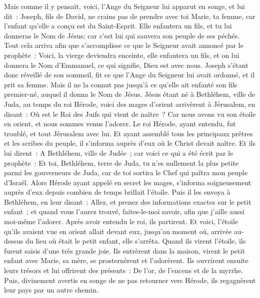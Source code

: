 \begin{multicols}{2}
Mais comme il y pensait, voici, l'Ange du Seigneur lui apparut en songe, et lui dit~: Joseph, fils de David, ne crains pas de prendre avec toi Marie, ta femme, car l'enfant qu'elle a conçu est du Saint-Esprit.
Elle enfantera un fils, et tu lui donneras le Nom de Jésus; car c'est lui qui sauvera son peuple de ses péchés.
Tout cela arriva afin que s'accomplisse ce que le Seigneur avait annoncé par le prophète~:
Voici, la vierge deviendra enceinte, elle enfantera un fils, et on lui donnera le Nom d'Emmanuel, ce qui signifie, Dieu est avec nous.
Joseph s'étant donc réveillé de son sommeil, fit ce que l'Ange du Seigneur lui avait ordonné, et il prit sa femme.
Mais il ne la connut pas jusqu'à ce qu'elle ait enfanté son fils premier-né, auquel il donna le Nom de Jésus.
\VerseOne{}Jésus étant né à Bethléhem, ville de Juda, au temps du roi Hérode, voici des mages d'orient arrivèrent à Jérusalem,
en disant~: Où est le Roi des Juifs qui vient de naître~? Car nous avons vu son étoile en orient, et nous sommes venus l'adorer.
Le roi Hérode, ayant entendu, fut troublé, et tout Jérusalem avec lui.
Et ayant assemblé tous les principaux prêtres et les scribes du peuple, il s'informa auprès d'eux où le Christ devait naître.
Et ils lui dirent~: A Bethléhem, ville de Judée~; car voici ce qui a été écrit par le prophète~:
Et toi, Bethléhem, terre de Juda, tu n'es nullement la plus petite parmi les gouverneurs de Juda, car de toi sortira le Chef qui paîtra mon peuple d'Israël.
Alors Hérode ayant appelé en secret les mages, s'informa soigneusement auprès d'eux depuis combien de temps brillait l'étoile.
Puis il les envoya à Bethléhem, en leur disant~: Allez, et prenez des informations exactes sur le petit enfant~; et quand vous l'aurez trouvé, faites-le-moi savoir, afin que j'aille aussi moi-même l'adorer.
Après avoir entendu le roi, ils partirent. Et voici, l'étoile qu'ils avaient vue en orient allait devant eux, jusqu'au moment où, arrivée au-dessus du lieu où était le petit enfant, elle s'arrêta.
Quand ils virent l'étoile, ils furent saisis d'une très grande joie.
Ils entrèrent dans la maison, virent le petit enfant avec Marie, sa mère, se prosternèrent et l'adorèrent. Ils ouvrirent ensuite leurs trésors et lui offrirent des présents~: De l'or, de l'encens et de la myrrhe.
Puis, divinement avertis en songe de ne pas retourner vers Hérode, ils regagnèrent leur pays par un autre chemin.

\end{multicols}

